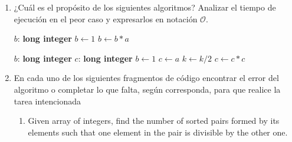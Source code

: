 \begin{enumerate}
\vspace*{15mm}


\begin{minipage}[t]{7cm}
\null 
 \begin{algorithm}[H]
\DontPrintSemicolon %
$i \gets 1$\;
 {
	$j \gets 1$\;
	 {
		$j \gets j+1$
	}
	$i \gets i + 1$
}
\caption{{} }
  \end{algorithm}
\end{minipage}%
\begin{minipage}[t]{7cm}
\null
 \begin{algorithm}[H]
\DontPrintSemicolon %
$i \gets 1$\;
 {
	$j \gets 1$\;
	 {
		$j \gets j+1$
	}
	$i \gets i + 2$
}
\caption{{ } }
\end{algorithm}
\end{minipage}

\newpage

	\item ¿Cuál es el propósito de los siguientes algoritmos? Analizar el tiempo de
	ejecución en el peor caso y expresarlos en notación $\mathcal{O}$.
		
\begin{minipage}[t]{7cm}
\null 
 \begin{algorithm}[H]
\DontPrintSemicolon %
$b$: \textbf{long integer}\;
$b \gets 1$\;
 {
$b \gets b*a$
}
\caption{{} }
  \end{algorithm}
\end{minipage}%
\begin{minipage}[t]{7cm}
\null
 \begin{algorithm}[H]
\DontPrintSemicolon
$b$: \textbf{long integer}\;
$c$: \textbf{long integer}\;
$b \gets 1$\;
$c \gets a$\;
 {
   {
	$k \gets k / 2$\;
	$c \gets c*c$\;
  }
}
\caption{{ } }
\end{algorithm}
\end{minipage}

\vspace{15mm}	
\item En cada uno de los siguientes fragmentos de código encontrar el error del algoritmo o completar lo que falta, según corresponda, para que realice la tarea intencionada
\begin{enumerate}
	\item Given array of integers, find the number of sorted pairs formed by its elements such that one element in the pair is divisible by the other one.


\end{enumerate}
\end{enumerate}
